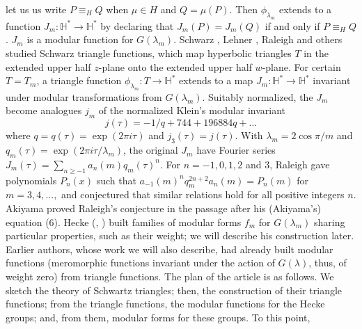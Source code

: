 \documentclass{article}
\begin{document}
let us us write $P \equiv_H Q$ when 
$\mu \in H$ and $Q = \mu(P)$.
Then $\phi_{\lambda_m}$ extends to 
a function
$J_m: \mathbb{H}^* \rightarrow \mathbb{H}^*$ by
declaring that
$J_m(P) = J_m(Q)$
if and only if 
$P \equiv_H Q$.
$J_m$ is a modular function
for $G(\lambda_m)$.
\newline \newline \noindent
Schwarz \cite{schwarz1873ueber}, 
Lehner \cite{lehner1954note},
Raleigh \cite{raleigh1962fourier}
and others
studied Schwarz triangle functions, 
which map  hyperbolic triangles $T$ in the 
 extended upper half $z$-plane  onto
 the extended upper half $w$-plane.
 For certain $T = T_m$, 
a triangle function 
$\phi_{\lambda_m}: T \to \mathbb{H}^*$
 extends to a map
$J_m: \mathbb{H}^* \rightarrow \mathbb{H}^*$
 invariant under
modular transformations
from $G(\lambda_m)$.
Suitably normalized, the $J_m$
become analogues 
$j_m$ of the normalized
Klein's modular invariant 
$$
j(\tau) = -1/q + 744 + 196884 q + ...
$$
where $q = q(\tau) = \exp (2 \pi i \tau)$ 
 and $j_3(\tau) = j(\tau)$.
 \newline \newline \noindent
With $\lambda_m = 2 \cos \pi/m$ and 
$q_m(\tau) = \exp (2 \pi i \tau/\lambda_m)$,
the original $J_m$ have Fourier series
$J_m(\tau)= \sum_{n \geq -1} a_n(m) q_m(\tau)^n$.
For  $n = -1, 0, 1, 2$ and $3$,
Raleigh \cite{raleigh1962fourier}
gave polynomials $P_n(x)$ such that 
$a_{-1}(m)^n q_m^{2n+2} a_n(m) = P_n(m)$
for $m = 3, 4, ...,$
and conjectured that similar 
relations hold for all positive integers
$n$.
Akiyama \cite{akiyama1992note}
proved Raleigh's conjecture
 in the passage 
after his (Akiyama's) equation (6).
\newline  \newline \noindent Hecke 
(\cite{berndt2008hecke}, \cite{hecke1936bestimmung})
built families of modular forms $f_m$
 for $G(\lambda_m)$
sharing particular properties,
such as their weight;
we will describe his construction later.
Earlier authors, whose work we will 
also describe,
had already built modular functions
(meromorphic functions
invariant under the
action of $G(\lambda)$,
thus, of weight zero)
from triangle functions.
\newline \newline \noindent
The plan of the article is as follows.
We sketch 
the theory of Schwartz triangles; then,
the construction of their
triangle functions;
from the triangle functions,
the modular functions
for the Hecke groups;
and, from them,
 modular forms
for these groups.
To this point,
\end{document}
